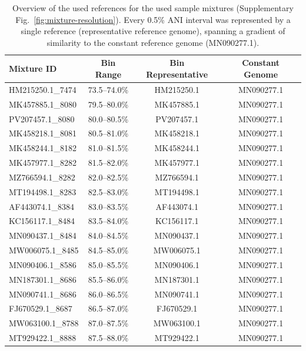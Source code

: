 \begin{table}[htbp]
    \centering
    \caption{Overview of the used references for the used sample mixtures (Supplementary Fig.~\ref{fig:mixture-resolution}). Every 0.5\% ANI interval was represented by a single reference (representative reference genome), spanning a gradient of similarity to the constant reference genome (MN090277.1).}
    \label{table:mixture}
    \begin{tabular}{lccc}
        \toprule
        \textbf{Mixture ID} & \textbf{Bin Range} & \textbf{Bin Representative} & \textbf{Constant Genome} \\
        \midrule
        HM215250.1\_7474 & 73.5--74.0\% & HM215250.1 & MN090277.1  \\
        MK457885.1\_8080 & 79.5--80.0\% & MK457885.1 & MN090277.1  \\
        PV207457.1\_8080 & 80.0--80.5\% & PV207457.1 & MN090277.1  \\
        MK458218.1\_8081 & 80.5--81.0\% & MK458218.1 & MN090277.1  \\
        MK458244.1\_8182 & 81.0--81.5\% & MK458244.1 & MN090277.1  \\
        MK457977.1\_8282 & 81.5--82.0\% & MK457977.1 & MN090277.1  \\
        MZ766594.1\_8282 & 82.0--82.5\% & MZ766594.1 & MN090277.1  \\
        MT194498.1\_8283 & 82.5--83.0\% & MT194498.1 & MN090277.1  \\
        AF443074.1\_8384 & 83.0--83.5\% & AF443074.1 & MN090277.1  \\
        KC156117.1\_8484 & 83.5--84.0\% & KC156117.1 & MN090277.1  \\
        MN090437.1\_8484 & 84.0--84.5\% & MN090437.1 & MN090277.1  \\
        MW006075.1\_8485 & 84.5--85.0\% & MW006075.1 & MN090277.1  \\
        MN090406.1\_8586 & 85.0--85.5\% & MN090406.1 & MN090277.1  \\
        MN187301.1\_8686 & 85.5--86.0\% & MN187301.1 & MN090277.1  \\
        MN090741.1\_8686 & 86.0--86.5\% & MN090741.1 & MN090277.1  \\
        FJ670529.1\_8687 & 86.5--87.0\% & FJ670529.1 & MN090277.1  \\
        MW063100.1\_8788 & 87.0--87.5\% & MW063100.1 & MN090277.1  \\
        MT929422.1\_8888 & 87.5--88.0\% & MT929422.1 & MN090277.1  \\

\end{tabular}
\end{table}
